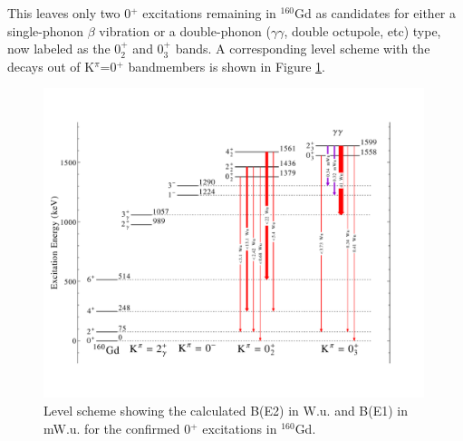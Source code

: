 This leaves only two 0$^+$ excitations remaining in $^{160}$Gd as candidates for either a single-phonon $\beta$ vibration or a double-phonon ($\gamma\gamma$, double octupole, etc) type, now labeled as the 0$^+_2$ and 0$^+_3$ bands.  A corresponding level scheme with the decays out of K$^\pi$=0$^+$ bandmembers is shown in Figure \ref{fig:160Gd_0s}. 

\begin{center}
\begin{figure}[h!]
\includegraphics[width=0.99\textwidth]{160Gd_Partial0sRevised.pdf}
\caption{Level scheme showing the calculated B(E2) in W.u. and B(E1) in mW.u. for the confirmed 0$^+$ excitations in $^{160}$Gd.
\label{fig:160Gd_0s}}
\end{figure}
\end{center}

